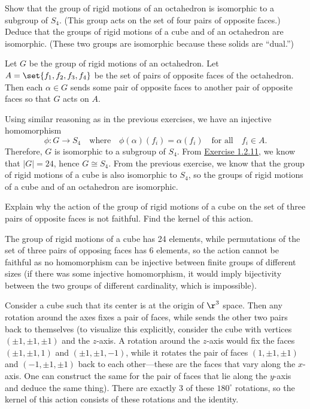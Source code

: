 \begin{exercise}\label{ex1.7.22}
    Show that the group of rigid motions of an octahedron is isomorphic to a subgroup of $S_4$.  
    (This group acts on the set of four pairs of opposite faces.) Deduce that the groups of rigid motions of a cube and of an octahedron are isomorphic. (These two groups are isomorphic because these solids are “dual.”)
\end{exercise}

\begin{sol}
    Let $G$ be the group of rigid motions of an octahedron. Let $A = \set{f_1, f_2, f_3, f_4}$ be the set of pairs of opposite faces of the octahedron. Then each $\alpha \in G$ sends some pair of opposite faces to another pair of opposite faces so that $G$ acts on $A$.

    Using similar reasoning as in the previous exercises, we have an injective homomorphism
    \[\phi : G \to S_4 \quad \text{where} \quad \phi(\alpha)(f_i) = \alpha(f_i) \quad \text{for all} \quad f_i \in A.\]
    Therefore, $G$ is isomorphic to a subgroup of $S_4$. From \hyperref[ex1.2.11]{Exercise 1.2.11}, we know that $|G| = 24$, hence $G \cong S_4$. From the previous exercise, we know that the group of rigid motions of a cube is also isomorphic to $S_4$, so the groups of rigid motions of a cube and of an octahedron are isomorphic.
\end{sol}

\begin{exercise}\label{ex1.7.23}
    Explain why the action of the group of rigid motions of a cube on the set of three pairs of opposite faces is not faithful. Find the kernel of this action.
\end{exercise}

\begin{sol}
    The group of rigid motions of a cube has 24 elements, while permutations of the set of three pairs of opposing faces has 6 elements, so the action cannot be faithful as no homomorphism can be injective between finite groups of different sizes (if there was some injective homomorphism, it would imply bijectivity between the two groups of different cardinality, which is impossible).
    
    Consider a cube such that its center is at the origin of $\r^3$ space. Then any rotation around the axes fixes a pair of faces, while sends the other two pairs back to themselves (to visualize this explicitly, consider the cube with vertices $(\pm 1, \pm 1, \pm 1)$ and the $z$-axis. A rotation around the $z$-axis would fix the faces $(\pm 1, \pm 1, 1)$ and $(\pm 1, \pm 1, -1)$, while it rotates the pair of faces $(1, \pm 1, \pm 1)$ and $(-1, \pm 1, \pm 1)$ back to each other---these are the faces that vary along the $x$-axis. One can construct the same for the pair of faces that lie along the $y$-axis and deduce the same thing). There are exactly 3 of these $180^\circ$ rotations, so the kernel of this action consists of these rotations and the identity.
\end{sol}
